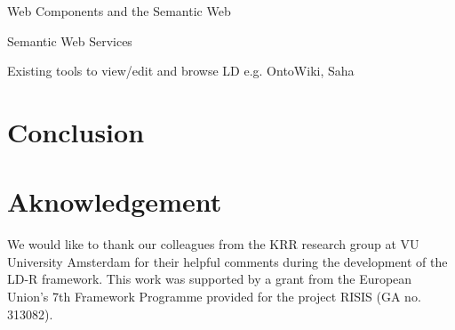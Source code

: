 \documentclass{acm_proc_article-sp}
\begin{document}
Web Components and the Semantic Web~\cite{pahl2011}

Semantic Web Services

Existing tools to view/edit and browse LD e.g. OntoWiki, Saha

\section{Conclusion}


\section{Aknowledgement}
We would like to thank our colleagues from the KRR research group at VU University Amsterdam for their helpful comments during the development of the LD-R framework. This work was supported by a grant from the European Union's 7th Framework Programme provided for the project RISIS (GA no. 313082).




\end{document}
